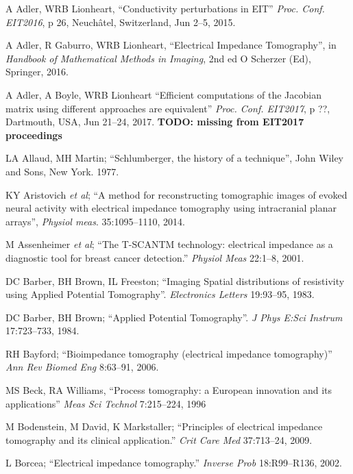 \documentclass[12pt]{article} \usepackage[margin=3cm]{geometry} \usepackage[margin=20pt,font=small,labelfont=bf]{caption}\def\TBLWIDA{35mm}\def\TBLWIDB{95mm}
\newcommand{\TODO}[1]{{\bf TODO: #1}}
\newcommand{\ifmaxthree}[2]{#2 {\em et al}; }
\begin{document}
\begin{thebibliography}{00}
A Adler, WRB Lionheart,
``Conductivity perturbations in EIT''
{\em Proc. Conf. EIT2016}, p 26, Neuchâtel, Switzerland, Jun 2--5, 2015.

A Adler, R Gaburro, WRB Lionheart,
``Electrical Impedance Tomography'',
 in {\em Handbook of Mathematical Methods in Imaging}, 2nd ed 
O Scherzer (Ed), Springer, 2016.

A Adler, A Boyle, WRB Lionheart
``Efficient computations of the Jacobian matrix using different approaches are equivalent''
{\em Proc. Conf. EIT2017}, p ??, Dartmouth, USA, Jun 21--24, 2017.
\TODO{missing from EIT2017 proceedings}

LA Allaud, MH Martin; 
``Schlumberger, the history of a technique'',
John Wiley and Sons, New York. 1977.

\ifmaxthree{
KY Aristovich, GS dos Santos, BC Packham, DS Holder. 
}{
KY Aristovich
}
``A method for reconstructing tomographic images of evoked neural activity with electrical impedance tomography using intracranial planar arrays'',
{\em Physiol meas}. 35:1095--1110, 2014.

\ifmaxthree{
M Assenheimer, O Laver-Moskovitz, D Malonek, D Manor, U Nahaliel, R Nitzan, A Saad
}{
M Assenheimer
}
``The T-SCANTM technology: electrical impedance as a diagnostic tool for breast cancer detection.''
{\em Physiol Meas} 22:1--8, 2001. %

DC Barber, BH Brown, IL Freeston;
``Imaging Spatial distributions of resistivity using Applied Potential Tomography''.
{\em Electronics Letters} 19:93--95, 1983.

DC Barber, BH Brown;
``Applied Potential Tomography''.
{\em  J Phys E:Sci Instrum} 17:723--733, 1984.

RH Bayford; 
``Bioimpedance tomography (electrical impedance tomography)''
{\em Ann Rev Biomed Eng} 8:63--91, 2006.

MS Beck, RA Williams,
``Process tomography: a European innovation and its applications''
{\em Meas Sci Technol} 7:215--224, 1996

M Bodenstein, M David, K Markstaller;
``Principles of electrical impedance tomography and its clinical application.''
{\em Crit Care Med} 37:713--24, 2009.

L Borcea;
``Electrical impedance tomography.''
{\em  Inverse Prob} 18:R99--R136, 2002.


\end{thebibliography}
\end{document}
